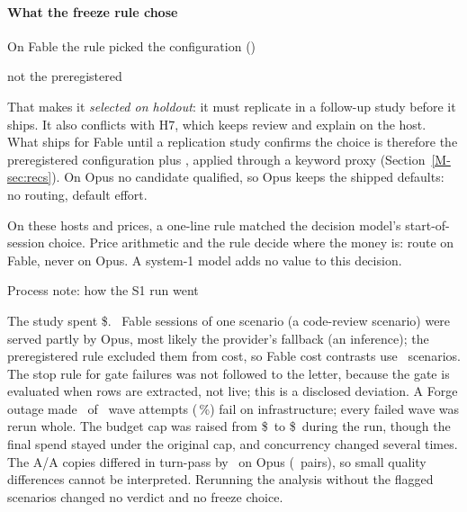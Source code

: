 \paragraph{What the freeze rule chose} On Fable the rule picked the configuration (\SFreezeFableRatio\X)
\begin{center}\small\code{\SFreezeFable}\end{center}
not the preregistered
\begin{center}\small\code{\SFreezeFablePrereg}\end{center} That makes it \emph{selected on holdout}: it must replicate in a follow-up study before it
ships. It also conflicts with H7, which keeps review and explain on the host. What ships for Fable until a replication study confirms the choice is
therefore the preregistered configuration plus , applied through a keyword proxy
(Section~\ref{M-sec:recs}). On Opus no candidate qualified, so
Opus keeps the shipped defaults: no routing, default effort.

\begin{keyidea}
On these hosts and prices, a one-line rule matched the decision model's start-of-session choice. Price arithmetic and
the rule decide where the money is: route on Fable, never on Opus. A system-1 model adds no value to this decision.
\end{keyidea}

\begin{processnote}{Process note: how the S1 run went}
\raggedright The study spent \$\SSpend. \SGateFail\ Fable sessions of one scenario
(a code-review scenario) were served partly by Opus, most likely the provider's fallback (an inference); the preregistered rule
excluded them from cost, so Fable cost contrasts use \SHOneN\ scenarios. The stop rule for gate failures was not followed
to the letter, because the gate is evaluated when rows are extracted, not live; this is a disclosed deviation. A Forge
outage made \SInfraAttempts\ of \SAttempts\ wave attempts (\SInfraPct\,\%) fail on infrastructure; every failed wave was
rerun whole. The budget cap was raised from \$\SBudgetOrig\ to \$\SBudgetFinal\ during the run, though the final spend
stayed under the original cap, and concurrency changed several times. The A/A copies differed in turn-pass by
\SNoiseOpusDtp\ on Opus (\SNoiseN\ pairs), so small quality differences cannot be interpreted. Rerunning the analysis
without the flagged scenarios changed no verdict and no freeze choice.
\end{processnote}


